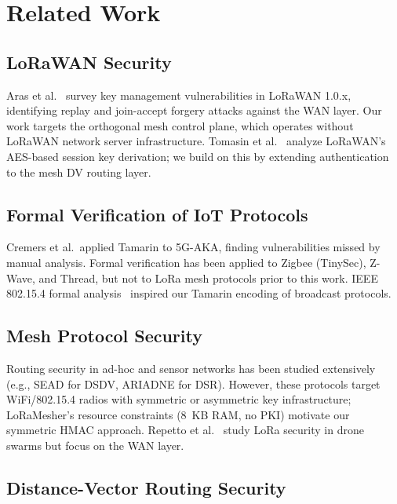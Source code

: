 \documentclass[journal]{IEEEtran}
\begin{document}
\section{Related Work}
\label{sec:related}

\subsection{LoRaWAN Security}

Aras et al.~\cite{ieee2025-lorawan-key-vulnerability} survey key
management vulnerabilities in LoRaWAN 1.0.x, identifying replay and
join-accept forgery attacks against the WAN layer. Our work targets
the orthogonal mesh control plane, which operates without LoRaWAN
network server infrastructure. Tomasin et al.~\cite{ieee2025-lorawan-aes-crypto}
analyze LoRaWAN's AES-based session key derivation; we build on this
by extending authentication to the mesh DV routing layer.

\subsection{Formal Verification of IoT Protocols}

Cremers et al.\ applied Tamarin to 5G-AKA, finding vulnerabilities
missed by manual analysis. Formal verification has been applied to
Zigbee (TinySec), Z-Wave, and Thread, but not to LoRa mesh protocols
prior to this work. IEEE 802.15.4 formal analysis~\cite{ieee2025-adr-eventb}
inspired our Tamarin encoding of broadcast protocols.

\subsection{Mesh Protocol Security}

Routing security in ad-hoc and sensor networks has been studied
extensively (e.g., SEAD for DSDV, ARIADNE for DSR). However, these
protocols target WiFi/802.15.4 radios with symmetric or asymmetric
key infrastructure; LoRaMesher's resource constraints (8~KB RAM,
no PKI) motivate our symmetric HMAC approach. Repetto
et al.~\cite{repetto2025-lorawan-drone-attack} study LoRa security
in drone swarms but focus on the WAN layer.

\subsection{Distance-Vector Routing Security}
\end{document}

